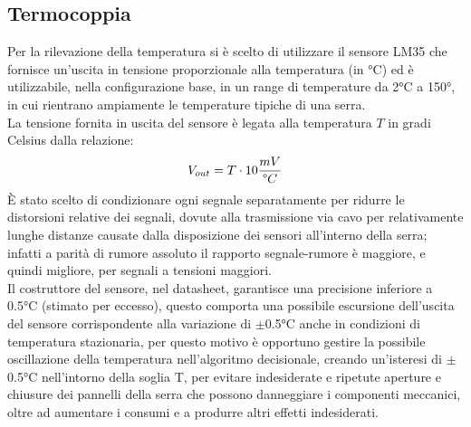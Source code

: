 \documentclass[12pt]{article}
\begin{document}
        \vspace{0.1cm}


    \subsection{Termocoppia}
    Per la rilevazione della temperatura si è scelto di utilizzare il sensore LM35 che fornisce un'uscita in tensione proporzionale alla temperatura (in °C) ed è utilizzabile, nella con\-fi\-gu\-ra\-zio\-ne base, in un range di temperature da 2°C a 150°, in cui rientrano ampiamente le temperature tipiche di una serra.\\
    La tensione fornita in uscita del sensore è legata alla temperatura $T$ in gradi Celsius dalla relazione:
    \begin{equation}
        V_{out} = T \cdot 10 \frac{mV}{\degree C}
    \end{equation}
    È stato scelto di condizionare ogni segnale separatamente per ridurre le distorsioni re\-la\-ti\-ve dei segnali, dovute alla trasmissione via cavo per relativamente lunghe distanze causate dalla disposizione dei sensori all'interno della serra; infatti a parità di rumore assoluto il rapporto segnale-rumore è maggiore, e quindi migliore, per segnali a tensioni maggiori.\\
    Il costruttore del sensore, nel datasheet, garantisce una precisione inferiore a 0.5°C (sti\-ma\-to per eccesso), questo comporta una possibile escursione dell'uscita del sensore cor\-ris\-pon\-den\-te alla variazione di $\pm$0.5°C anche in condizioni di temperatura stazionaria, per questo motivo è opportuno gestire la possibile oscillazione della temperatura nell'al\-go\-rit\-mo decisionale, creando un'isteresi di $\pm$0.5°C nell'intorno della soglia T, per evitare indesiderate e ripetute aperture e chiusure dei pannelli della serra che possono dan\-neg\-gia\-re i componenti meccanici, oltre ad aumentare i consumi e a produrre altri effetti indesiderati.
    
\end{document}
